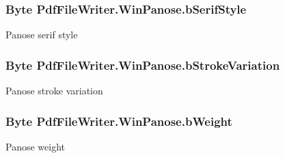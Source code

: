 \subsubsection[{\texorpdfstring{b\+Serif\+Style}{bSerifStyle}}]{\setlength{\rightskip}{0pt plus 5cm}Byte Pdf\+File\+Writer.\+Win\+Panose.\+b\+Serif\+Style\hspace{0.3cm}{\ttfamily [get]}}\hypertarget{class_pdf_file_writer_1_1_win_panose_ae57232a6e04df7d5b74957444ce3a414}{}\label{class_pdf_file_writer_1_1_win_panose_ae57232a6e04df7d5b74957444ce3a414}


Panose serif style 

\subsubsection[{\texorpdfstring{b\+Stroke\+Variation}{bStrokeVariation}}]{\setlength{\rightskip}{0pt plus 5cm}Byte Pdf\+File\+Writer.\+Win\+Panose.\+b\+Stroke\+Variation\hspace{0.3cm}{\ttfamily [get]}}\hypertarget{class_pdf_file_writer_1_1_win_panose_ad96cc96941ffd36487aa9ed39c85e5c9}{}\label{class_pdf_file_writer_1_1_win_panose_ad96cc96941ffd36487aa9ed39c85e5c9}


Panose stroke variation 

\subsubsection[{\texorpdfstring{b\+Weight}{bWeight}}]{\setlength{\rightskip}{0pt plus 5cm}Byte Pdf\+File\+Writer.\+Win\+Panose.\+b\+Weight\hspace{0.3cm}{\ttfamily [get]}}\hypertarget{class_pdf_file_writer_1_1_win_panose_a37225f24bcba664e0971f1c78e3d47f3}{}\label{class_pdf_file_writer_1_1_win_panose_a37225f24bcba664e0971f1c78e3d47f3}


Panose weight 

